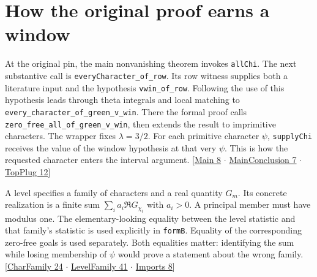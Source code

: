 \documentclass[12pt,letterpaper]{article}
\newcommand{\id}[1]{{\small\nolinkurl{#1}}}
\begin{document}
\section{How the original proof earns a window}\label{sec:old}
At the original pin, the main nonvanishing theorem invokes \id{allChi}. The next substantive call is \id{everyCharacter_of_row}. Its row witness supplies both a literature input and the hypothesis \id{vwin_of_row}. Following the use of this hypothesis leads through theta integrals and local matching to \id{every_character_of_green_v_win}. There the formal proof calls \id{zero_free_all_of_green_v_win}, then extends the result to imprimitive characters. The wrapper fixes $\lambda=3/2$. For each primitive character $\psi$, \id{supplyChi} receives the value of the window hypothesis at that very $\psi$. This is how the requested character enters the interval argument. {\small\sffamily\color{mute}[\href{https://github.com/nousentllc/riemann-hypothesis/blob/40e56bab026552e089d7afcfeff08d2defb9c005/src/Main.lean#L8}{Main 8} $\cdot$ \href{https://github.com/nousentllc/riemann-hypothesis/blob/40e56bab026552e089d7afcfeff08d2defb9c005/src/Development/AutomorphicArithmetic/CharacterBoxes/MainConclusion.lean#L7}{MainConclusion 7} $\cdot$ \href{https://github.com/nousentllc/riemann-hypothesis/blob/40e56bab026552e089d7afcfeff08d2defb9c005/src/Development/AutomorphicArithmetic/ThetaCorrespondence/ThetaPairLifts/ThirdPlaceSeries/TopPlug.lean#L12}{TopPlug 12}]}

A level specifies a family of characters and a real quantity $G_m$. Its concrete realization is a finite sum $\sum_i a_i\Re G_{\chi_i}$ with $a_i>0$. A principal member must have modulus one. The elementary-looking equality between the level statistic and that family's statistic is used explicitly in \id{formB}. Equality of the corresponding zero-free goals is used separately. Both equalities matter: identifying the sum while losing membership of $\psi$ would prove a statement about the wrong family. {\small\sffamily\color{mute}[\href{https://github.com/nousentllc/riemann-hypothesis/blob/40e56bab026552e089d7afcfeff08d2defb9c005/src/Development/AutomorphicArithmetic/DedekindLFunctions/CharFamily.lean#L24}{CharFamily 24} $\cdot$ \href{https://github.com/nousentllc/riemann-hypothesis/blob/40e56bab026552e089d7afcfeff08d2defb9c005/src/Development/AutomorphicArithmetic/PrimitiveCosets/LevelFamily.lean#L41}{LevelFamily 41} $\cdot$ \href{https://github.com/nousentllc/riemann-hypothesis/blob/40e56bab026552e089d7afcfeff08d2defb9c005/src/Development/AutomorphicArithmetic/PrimitiveCosets/Imports.lean#L8}{Imports 8}]}
\end{document}
